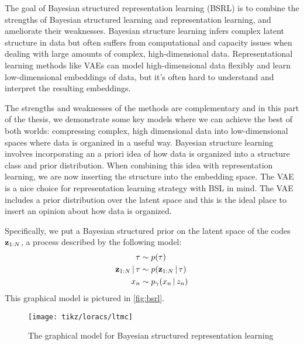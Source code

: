The goal of Bayesian structured
representation learning (BSRL)
is to combine the
strengths of
Bayesian structured learning
and representation learning,
and ameliorate their weaknesses.
Bayesian structure learning
infers complex latent structure
in data but often suffers from
computational and capacity issues
when dealing with large amounts of
complex, high-dimensional data.
Representational learning methods
like VAEs can model high-dimensional
data flexibly and learn low-dimensional
embeddings of data,
but it's often hard to understand 
and interpret the resulting embeddings.

The strengths and weaknesses of
the methods are complementary
and in this part of the thesis, we demonstrate
some key models where we can
achieve the best of both worlds:
compressing complex, high dimensional
data into low-dimensional spaces
where data is organized in a useful way.
Bayesian structure learning
involves incorporating an a priori
idea of how data is organized
into a structure class and
prior distribution.
When combining this idea with representation
learning, we are now inserting
the structure into the embedding space.
The VAE is a nice choice
for representation learning strategy
with BSL in mind. The VAE includes
a prior distribution over the latent space
and this is the ideal place to
insert an opinion about
how data is organized.

Specifically, we put a Bayesian structured prior
on the latent space of the codes $\mathbf{z}_{1:N}$,
a process described by the following model:
\begin{align*}
    \tau &\sim p(\tau) \\
    \mathbf{z}_{1:N} \,|\, \tau &\sim p(\mathbf{z}_{1:N} \,|\, \tau) \\
    x_n &\sim p_\gamma(x_n \,|\, z_n)
\end{align*}
This graphical model is pictured in 
\autoref{fig:bsrl}.

\begin{figure}[H]
    \centering
    \texttt{[image: tikz/loracs/ltmc]}
    \caption{The graphical model for
    Bayesian structured representation learning}
    \label{fig:bsrl}
\end{figure}

